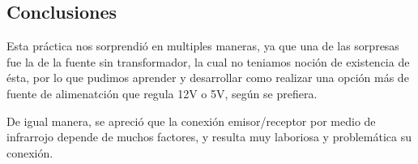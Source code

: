 \subsection{Conclusiones}

Esta práctica nos sorprendió en multiples maneras, ya que una de las sorpresas fue la de la fuente sin transformador, la cual no teniamos noción de existencia de ésta,
por lo que pudimos aprender y desarrollar como realizar una opción más de fuente de alimenatción que regula 12V o 5V, según se prefiera.

De igual manera, se apreció que la conexión emisor/receptor por medio de infrarrojo depende de muchos factores, y resulta muy laboriosa y problemática su conexión.
